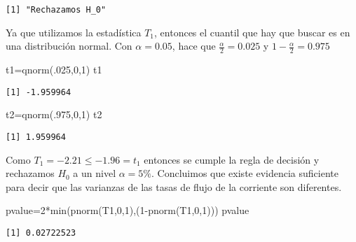 \documentclass[
  a4paper,
  oneside,
  openany]{book}
\newenvironment{Shaded}{\begin{snugshade}}{\end{snugshade}}
\newcommand{\DecValTok}[1]{\textcolor[rgb]{0.00,0.00,0.81}{#1}}
\newcommand{\FunctionTok}[1]{\textcolor[rgb]{0.00,0.00,0.00}{#1}}
\newcommand{\NormalTok}[1]{#1}
\newcommand{\OtherTok}[1]{\textcolor[rgb]{0.56,0.35,0.01}{#1}}
\newcommand{\SpecialCharTok}[1]{\textcolor[rgb]{0.00,0.00,0.00}{#1}}
\begin{document}
\begin{verbatim}
[1] "Rechazamos H_0"
\end{verbatim}

Ya que utilizamos la estadística \(T_1\), entonces el cuantil que hay que buscar es en una distribución normal. Con \(\alpha=0.05\), hace que \(\frac{\alpha}{2}=0.025\) y \(1-\frac{\alpha}{2}=0.975\)

\begin{Shaded}
\begin{Highlighting}[]
\NormalTok{t1}\OtherTok{=}\FunctionTok{qnorm}\NormalTok{(.}\DecValTok{025}\NormalTok{,}\DecValTok{0}\NormalTok{,}\DecValTok{1}\NormalTok{)}
\NormalTok{t1}
\end{Highlighting}
\end{Shaded}

\begin{verbatim}
[1] -1.959964
\end{verbatim}

\begin{Shaded}
\begin{Highlighting}[]
\NormalTok{t2}\OtherTok{=}\FunctionTok{qnorm}\NormalTok{(.}\DecValTok{975}\NormalTok{,}\DecValTok{0}\NormalTok{,}\DecValTok{1}\NormalTok{)}
\NormalTok{t2}
\end{Highlighting}
\end{Shaded}

\begin{verbatim}
[1] 1.959964
\end{verbatim}

Como \(T_1=-2.21\leq -1.96 =t_1\) entonces se cumple la regla de decisión y rechazamos \(H_0\) a un nivel \(\alpha=5\%\). Concluimos que existe evidencia suficiente para decir que las varianzas de las tasas de flujo de la corriente son diferentes.

\begin{Shaded}
\begin{Highlighting}[]
\NormalTok{pvalue}\OtherTok{=}\DecValTok{2}\SpecialCharTok{*}\FunctionTok{min}\NormalTok{(}\FunctionTok{pnorm}\NormalTok{(T1,}\DecValTok{0}\NormalTok{,}\DecValTok{1}\NormalTok{),(}\DecValTok{1}\SpecialCharTok{{-}}\FunctionTok{pnorm}\NormalTok{(T1,}\DecValTok{0}\NormalTok{,}\DecValTok{1}\NormalTok{)))}
\NormalTok{pvalue}
\end{Highlighting}
\end{Shaded}

\begin{verbatim}
[1] 0.02722523
\end{verbatim}
\end{document}
